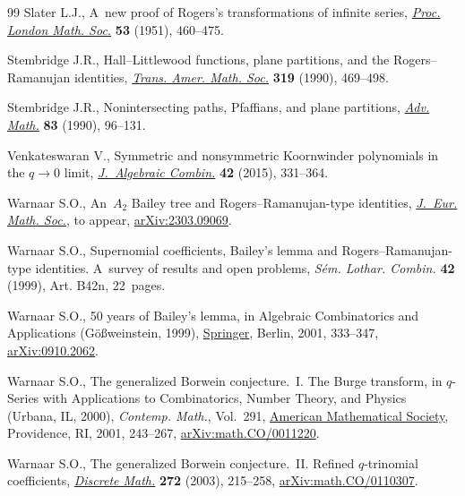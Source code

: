 \documentclass[pdftex]{sigma}
\numberwithin{equation}{section}
\begin{document}
\begin{thebibliography}{99}
Slater L.J., A~new proof of {R}ogers's transformations of infinite series,
 \href{https://doi.org/10.1112/plms/s2-53.6.460}{\textit{Proc. London Math.
 Soc.}} \textbf{53} (1951), 460--475.

Stembridge J.R., Hall--{L}ittlewood functions, plane partitions, and the
 {R}ogers--{R}amanujan identities,
 \href{https://doi.org/10.2307/2001250}{\textit{Trans. Amer. Math. Soc.}}
 \textbf{319} (1990), 469--498.

Stembridge J.R., Nonintersecting paths, {P}faffians, and plane partitions,
 \href{https://doi.org/10.1016/0001-8708(90)90070-4}{\textit{Adv. Math.}}
 \textbf{83} (1990), 96--131.

Venkateswaran V., Symmetric and nonsymmetric {K}oornwinder polynomials in the
 {$q\rightarrow 0$} limit,
 \href{https://doi.org/10.1007/s10801-015-0583-4}{\textit{J.~Algebraic
 Combin.}} \textbf{42} (2015), 331--364.

Warnaar S.O., An~$A_2$ Bailey tree and  {R}ogers--{R}amanujan-type
 identities, \href{https://doi.org/10.4171/JEMS/1627}{\textit{J.~Eur. Math.
 Soc.}}, {t}o appear, \href{http://arxiv.org/abs/2303.09069}{arXiv:2303.09069}.

Warnaar S.O., Supernomial coefficients, {B}ailey's lemma and
 {R}ogers--{R}amanujan-type identities. {A}~survey of results and open
 problems, \textit{S\'em. Lothar. Combin.} \textbf{42} (1999), Art. B42n,
 22~pages.

Warnaar S.O., 50 years of {B}ailey's lemma, in Algebraic Combinatorics and
 Applications ({G}\"o\ss weinstein, 1999),
 \href{https://doi.org/10.1007/978-3-642-59448-9_23}{Springer}, Berlin, 2001,
 333--347, \href{http://arxiv.org/abs/0910.2062}{arXiv:0910.2062}.

Warnaar S.O., The generalized {B}orwein conjecture.~{I}. {T}he {B}urge
 transform, in {$q$}-Series with Applications to Combinatorics, Number Theory,
 and Physics ({U}rbana, {IL}, 2000), \textit{Contemp. Math.}, Vol.~291,
 \href{https://doi.org/10.1090/conm/291/04906}{American Mathematical Society},
 Providence, RI, 2001, 243--267,
 \href{http://arxiv.org/abs/math.CO/0011220}{arXiv:math.CO/0011220}.

Warnaar S.O., The generalized {B}orwein conjecture.~{II}. {R}efined
 {$q$}-trinomial coefficients,
 \href{https://doi.org/10.1016/S0012-365X(03)00047-5}{\textit{Discrete Math.}}
 \textbf{272} (2003), 215--258,
 \href{http://arxiv.org/abs/math.CO/0110307}{arXiv:math.CO/0110307}.


\end{thebibliography}
\end{document}
